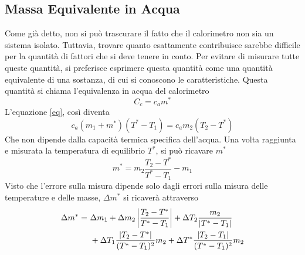 \documentclass[a4paper]{article}
\begin{document}
\subsection{Massa Equivalente in Acqua}
Come già detto, non si può trascurare il fatto che il calorimetro non sia un sistema isolato. Tuttavia, trovare quanto esattamente contribuisce sarebbe difficile per la quantità di fattori che si deve tenere in conto. Per evitare di misurare tutte queste quantità, si preferisce esprimere questa quantità come una quantità equivalente di una sostanza, di cui si conoscono le caratteristiche. Questa quantità si chiama l'equivalenza in acqua del calorimetro
\begin{equation}
    C_c = c_am^*
\end{equation}
L'equazione \ref{eq}, così diventa 
\begin{equation}
    c_a (m_1+m^*)(T^*-T_1) = c_a m_2 (T_2-T^*) 
\end{equation}
Che non dipende dalla capacità termica specifica dell'acqua. Una volta raggiunta e misurata la temperatura di equilibrio $T^*$, si può ricavare $m^*$ 
\begin{equation}
    m^{*} = m_{2} \frac{T_2 - T^*}{T^* - T_1} - m_{1}
\end{equation}
Visto che l'errore sulla misura dipende solo dagli errori sulla misura delle temperature e delle masse, $\Delta m^*$ si ricaverà attraverso 
\begin{align}
\Delta m^* =\ & \Delta m_1 + \Delta m_2 \left| \frac{T_2 - T^*}{T^* - T_1} \right| 
+ \Delta T_2 \frac{m_2}{|T^* - T_1|} \notag \\
& + \Delta T_1 \frac{|T_2 - T^*|}{(T^* - T_1)^2} m_2 
+ \Delta T^* \frac{|T_2 - T_1|}{(T^* - T_1)^2} m_2
\end{align}
\end{document}
